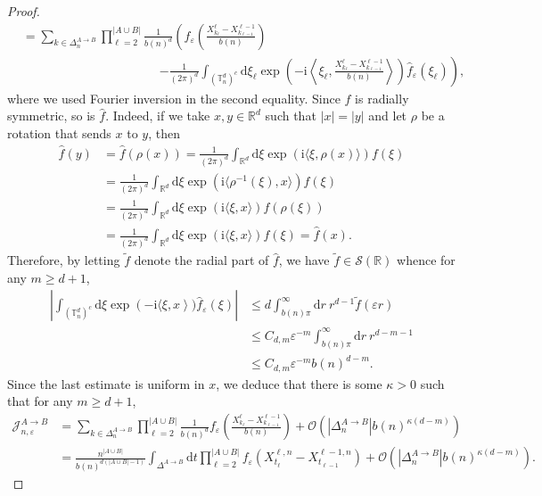 \documentclass[10pt,a4paper]{amsart}
\newcommand{\RR}{\mathbb R}
\newcommand{\TT}{\mathbb T}
\newcommand{\1}{\mathds{1}}
\renewcommand{\d}{\mathrm d}
\renewcommand{\i}{\mathrm i}
\numberwithin{equation}{section}
\begin{document}
\begin{proof}
\begin{align*}
        &=\sum_{k\in\Delta_n^{A\rightarrow B}}\prod_{\ell=2}^{|A\cup B|}\frac{1}{b(n)^d}\left(f_\varepsilon\left(\frac{X_{k_\ell}^{\ell}-X_{k_{\ell-1}}^{{\ell-1}}}{b(n)}\right)\right.\\
        &\quad\quad \quad\quad\quad\quad\quad\quad\quad\quad\quad\left.-\frac{1}{(2\pi)^d}\int_{(\TT_n^d)^c}\d\xi_\ell\exp\left(-\i\left\langle\xi_\ell,\frac{X_{k_\ell}^{\ell}-X_{k_{\ell-1}}^{{\ell-1}}}{b(n)}\right\rangle\right)\hat f_\varepsilon(\xi_\ell)\right),
    \end{align*}
    where we used Fourier inversion in the second equality. Since $f$ is radially symmetric, so is $\hat f$. Indeed, if we take $x,y\in\RR^d$ such that $|x|=|y|$ and let $\rho$ be a rotation that sends $x$ to $y$, then
    \begin{align*}
        \hat f(y)&=\hat f(\rho(x))=\frac{1}{(2\pi)^d}\int_{\RR^d}\d\xi\exp(\i\langle\xi,\rho(x)\rangle)f(\xi)\\
        &=\frac{1}{(2\pi)^d}\int_{\RR^d}\d\xi\exp(\i\langle\rho^{-1}(\xi),x\rangle)f(\xi)\\
        &=\frac{1}{(2\pi)^d}\int_{\RR^d}\d\xi\exp(\i\langle\xi,x\rangle)f(\rho(\xi))\\
        &=\frac{1}{(2\pi)^d}\int_{\RR^d}\d\xi\exp(\i\langle\xi,x\rangle)f(\xi)=\hat f(x).
    \end{align*}
    Therefore, by letting $\widetilde f$ denote the radial part of $\hat f$, we have $\widetilde f\in\mathcal S(\RR)$ whence for any $m\ge d+1$,
    \begin{align*}
        \left|\int_{(\TT_n^d)^c}\d\xi\exp\left(-\i\langle \xi,x\right\rangle)\hat f_\varepsilon(\xi)\right|&\le {d}\int_{b(n)\pi}^\infty\d r\ r^{d-1}\widetilde f(\varepsilon r)\\
        &\le C_{d,m}\varepsilon^{-m}\int_{b(n)\pi}^\infty\d r\ r^{d-m-1}\\
        &\le C_{d,m}\varepsilon^{-m}b(n)^{d-m}.
    \end{align*}
    Since the last estimate is uniform in $x$, we deduce that there is some $\kappa>0$ such that for any $m\ge d+1$,
    \begin{align*}
        \mathcal J_{n,\varepsilon}^{A\rightarrow B}&=\sum_{k\in\Delta_n^{A\rightarrow B}}\prod_{\ell=2}^{|A\cup B|}\frac{1}{b(n)^d}f_\varepsilon\left(\frac{X_{k_\ell}^{\ell}-X_{k_{\ell-1}}^{{\ell-1}}}{b(n)}\right)+\mathcal O\left(|\Delta_n^{A\rightarrow B}|b(n)^{\kappa(d-m)}\right)\\
        &=\frac{n^{|A\cup B|}}{b(n)^{d(|A\cup B|-1)}}\int_{\Delta^{A\rightarrow B}}\d t\prod_{\ell=2}^{|A\cup B|}f_\varepsilon\left(X_{t_\ell}^{\ell,n}-X_{t_{\ell-1}}^{\ell-1,n}\right)+\mathcal O\left(|\Delta_n^{A\rightarrow B}|b(n)^{\kappa(d-m)}\right).

\end{align*}
\end{proof}
\end{document}
